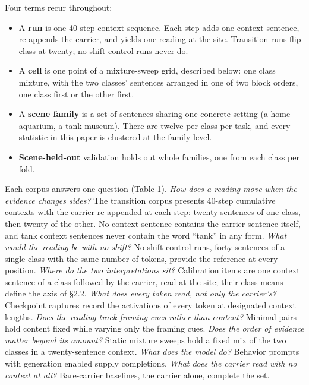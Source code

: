 \documentclass[11pt]{article}
\begin{document}
Four terms recur throughout:

\begin{itemize}
\item A \textbf{run} is one 40-step context sequence. Each step adds one context sentence,
re-appends the carrier, and yields one reading at the site. Transition runs flip
class at twenty; no-shift control runs never do.
\item A \textbf{cell} is one point of a mixture-sweep grid, described below: one class mixture,
with the two classes' sentences arranged in one of two block orders, one class
first or the other first.
\item A \textbf{scene family} is a set of sentences sharing one concrete setting (a home
aquarium, a tank museum). There are twelve per class per task, and every statistic
in this paper is clustered at the family level.
\item \textbf{Scene-held-out} validation holds out whole families, one from each class per
fold.
\end{itemize}

Each corpus answers one question (Table 1). \emph{How does a reading move when the
evidence changes sides?} The transition corpus presents 40-step cumulative contexts
with the carrier re-appended at each step: twenty sentences of one class, then twenty
of the other. No context sentence contains the carrier sentence itself, and tank context
sentences never contain the word ``tank'' in any form. \emph{What would the reading be with
no shift?} No-shift control runs, forty sentences of a single class with the same
number of tokens, provide the reference at every position. \emph{Where do the two
interpretations sit?} Calibration items are one context sentence of a class followed
by the carrier, read at the site; their class means define the axis of \S2.2. \emph{What
does every token read, not only the carrier's?} Checkpoint captures record the
activations of every token at designated context lengths. \emph{Does the reading track
framing cues rather than content?} Minimal pairs hold content fixed while varying
only the framing cues. \emph{Does the order of evidence matter beyond its amount?} Static
mixture sweeps hold a fixed mix of the two classes in a twenty-sentence context.
\emph{What does the model do?} Behavior prompts with generation enabled supply
completions. \emph{What does the carrier read with no context at all?} Bare-carrier
baselines, the carrier alone, complete the set.
\end{document}

